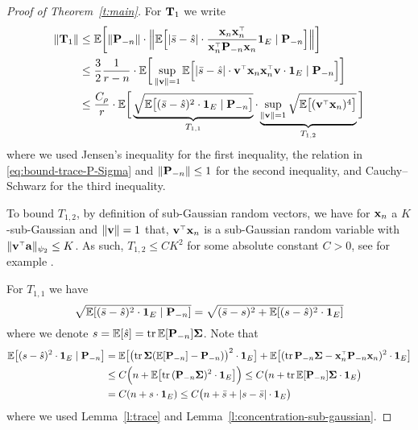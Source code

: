 \documentclass[11pt]{article}
\begin{document}
\begin{proof}[Proof of Theorem~\ref{t:main}]
For $\T_1$ we write
\begin{align*}
  \|\T_1\|    &\leq\E\bigg[\|\P_{-n}\|\cdot \Big\|\E\Big[|\bar s-\hat s|\cdot
    \frac{\x_n\x_n^\top}{\x_n^\top\P_{-n}\x_n}\one_E\mid\P_{-n}\Big]
    \Big\|\bigg]
  \\
          &\leq \frac32 \frac1{r-n} \cdot \E\bigg[\sup_{\| \v \| = 1}\E\Big[
            |\bar s-\hat s|\cdot \v^\top\x_n\x_n^\top\v\cdot\one_E\mid
            \P_{-n}\Big]\bigg]
  \\
  &\leq \frac{C_\rho}{r}\cdot \E\bigg[\underbrace{\sqrt{\E\big[(\bar s-\hat
    s)^2\cdot \one_E \mid\P_{-n}\big]}}_{ T_{1,1} }\cdot
    \underbrace{\sup_{ \| \v \| = 1 }\sqrt{\E\big[(\v^\top\x_n)^4\big]}}_{ T_{1,2} }\bigg]
\end{align*}
where we used Jensen's inequality for the first inequality, the relation in \eqref{eq:bound-trace-P-Sigma} and $\| \P_{-n} \| \le 1$ for the second inequality, and Cauchy–Schwarz for the third inequality.

To bound $T_{1,2}$, by definition of sub-Gaussian random vectors, we have for $\x_n$ a $K$-sub-Gaussian and $\| \v \| = 1$ that, $\v^\top \x_n$ is a sub-Gaussian random variable with $\|\v^\top \a \|_{\psi_2} \leq K$. As such, $T_{1,2} \le C K^2$ for some absolute constant $C > 0$, see for example \cite[Section~2.5.2]{vershynin2018high}.

For $T_{1,1}$ we have
\[
  \sqrt{ \E [(\bar s-\hat s)^2 \cdot\one_E \mid\P_{-n}] } = \sqrt{ (\bar s - s)^2 + \E[(s - \hat s)^2 \cdot\one_E] }
\]
where we denote $s=\E[\hat s]=\tr\,\E[\P_{-n}]\Sigmab$. Note that
\begin{align*}
  \E\big[(s - \hat s)^2 \cdot\one_E \mid \P_{-n}\big] &=
\E\big[\big(\tr\,\Sigmab(\E[\P_{-n}]-\P_{-n})\big)^2 \cdot\one_E \big] +
  \E\big[(\tr\,\P_{-n}\Sigmab-\x_n^\top\P_{-n}\x_n)^2 \cdot\one_E \big]\\
  &\leq C\Big(n + \E\big[\tr\,(\P_{-n}\Sigmab)^2 \cdot\one_E \big]\Big)\leq
    C\big(n + \tr\,\E[\P_{-n}]\Sigmab \cdot\one_E\big)\\
  &=C(n+s \cdot\one_E)\leq C\big(n+\bar s + |s- \bar s| \cdot\one_E\big)
\end{align*}
where we used Lemma~\ref{l:trace} and Lemma~\ref{l:concentration-sub-gaussian}.


\end{proof}
\end{document}
